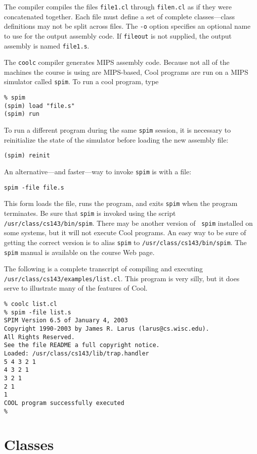 \documentclass[11pt]{article}
\begin{document}
The compiler compiles the files {\tt file1.cl} through {\tt filen.cl}
as if they were concatenated together.  Each file must define a
set of complete classes---class definitions may not be split across
files.  The {\tt -o} option specifies an optional name to use for the
output assembly code.  If {\tt fileout} is not supplied, the output
assembly is named {\tt file1.s}.

The {\tt coolc} compiler generates MIPS assembly code.  Because not
all of the machines the course is using are MIPS-based, Cool
programs are run on a MIPS simulator called {\tt spim}.  To run a cool
program, type
\begin{verbatim}
% spim
(spim) load "file.s"
(spim) run
\end{verbatim}
To run a different program during the same {\tt spim} session, it is
necessary to reinitialize the state of the simulator before loading the
new assembly file:
\begin{verbatim}
(spim) reinit
\end{verbatim}
An alternative---and faster---way to invoke {\tt spim} is with a file:
\begin{verbatim}
spim -file file.s
\end{verbatim}
This form loads the file, runs the program, and exits {\tt spim} when
the program terminates.  Be sure that {\tt spim} is invoked using the
script {\tt /usr/class/cs143/bin/spim}.  There may be another version of {\tt
spim} installed on some systems, but it will not execute Cool
programs.  An easy way to be sure of getting the correct version is to
alias {\tt spim} to {\tt /usr/class/cs143/bin/spim}.  The {\tt spim} manual is
available on the course Web page.

The following is a complete transcript of compiling and
executing {\tt /usr/class/cs143/examples/list.cl}.  This program is very
silly, but it does serve to illustrate many of the features of
Cool.

\begin{verbatim}
% coolc list.cl
% spim -file list.s
SPIM Version 6.5 of January 4, 2003
Copyright 1990-2003 by James R. Larus (larus@cs.wisc.edu).
All Rights Reserved.
See the file README a full copyright notice.
Loaded: /usr/class/cs143/lib/trap.handler
5 4 3 2 1
4 3 2 1
3 2 1
2 1
1
COOL program successfully executed
% 
\end{verbatim}

\section{Classes}
\end{document}
